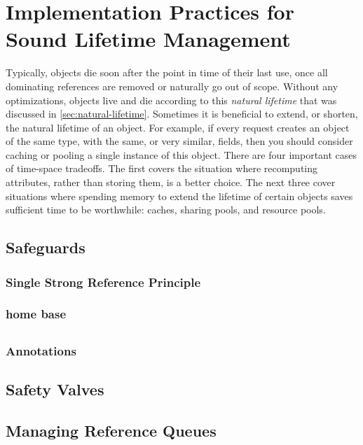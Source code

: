 \chapter{Implementation Practices for Sound Lifetime Management}

Typically, objects die soon after the point in time of their last use, once all
dominating references are removed or naturally go out of scope. Without any
optimizations, objects live and die according to this \emph{natural lifetime}
that was discussed in \autoref{sec:natural-lifetime}. Sometimes it is beneficial
to extend, or shorten, the natural lifetime of an object. For example, if every
request creates an object of the same type, with the same, or very similar,
fields, then you should consider caching or pooling a single instance of this
object. There are four important cases of time-space tradeoffs. The first covers
the situation where recomputing attributes, rather than storing them, is a better
choice. The next three cover situations where spending memory to extend the
lifetime of certain objects saves sufficient time to be worthwhile: caches,
sharing pools, and resource pools.



\section{Safeguards}
\subsection{Single Strong Reference Principle}
\subsection{home base}

\section{}
\subsection{Annotations}

\section{Safety Valves}

\section{Managing Reference Queues}


